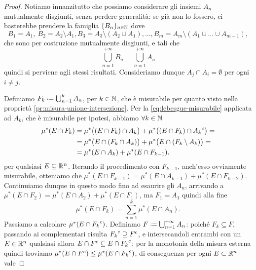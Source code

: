 \begin{proof}
	Notiamo innanzitutto che possiamo considerare gli insiemi $A_n$ mutualmente disgiunti, senza perdere generalità: se già non lo fossero, ci basterebbe prendere la famiglia $\{B_n\}_{n\in\mathbb{N}}$ dove
	\begin{equation}
		B_1=A_1,\ B_2=A_2\setminus A_1, B_3=A_3\setminus(A_2\cup A_1),\dots,B_m=A_m\setminus(A_1\cup\dots\cup A_{m-1}),
	\end{equation}
	che sono per costruzione mutualmente disgiunti, e tali che
	\begin{equation}
		\bigcup_{n=1}^{+\infty}B_n=\bigcup_{n=1}^{+\infty}A_n
	\end{equation}
	quindi si perviene agli stessi risultati.
	Consideriamo dunque $A_j\cap A_i=\emptyset$ per ogni $i\neq j$.

	Definiamo $F_k\defeq\bigcup_{n=1}^kA_n$, per $k\in\mathbb{N}$, che è misurabile per quanto visto nella proprietà \ref{pr:misura-unione-intersezione}.
	Per la \eqref{eq:lebesgue-misurabile} applicata ad $A_k$, che è misurabile per ipotesi, abbiamo $\forall k\in\mathbb{N}$
	\begin{equation}
		\begin{split}
			\mu^*(E\cap F_k)&=\mu^*\big( (E\cap F_k)\cap A_k\big)+\mu^*\big( (E\cap F_k)\cap{A_k}^c\big)=\\
			&=\mu^*\big(E\cap(F_k\cap A_k)\big)+\mu^*\big(E\cap (F_k\setminus A_k)\big)=\\
			&=\mu^*(E\cap A_k)+\mu^*(E\cap F_{k-1}).
		\end{split}
	\end{equation}
	per qualsiasi $E\subseteq\mathbb{R}^n$.
	Iterando il procedimento con $F_{k-1}$, anch'esso ovviamente misurabile, otteniamo che $\mu^*(E\cap F_{k-1})=\mu^*(E\cap A_{k-1})+\mu^*(E\cap F_{k-2})$.
	Continuiamo dunque in questo modo fino ad esaurire gli $A_n$, arrivando a $\mu^*(E\cap F_2)=\mu^*(E\cap A_2)+\mu^*(E\cap F_1)$, ma $F_1=A_1$ quindi alla fine
	\begin{equation}
		\mu^*(E\cap F_k)=\sum_{n=1}^k\mu^*(E\cap A_n).
	\end{equation}
	Passiamo a calcolare $\mu^*(E\cap{F_k}^c)$.
	Definiamo $F\defeq\bigcup_{n=1}^{+\infty}A_n$: poich\'e $F_k\subseteq F$, passando ai complementari risulta ${F_k}^c\supseteq{F}^c$, e intersecandoli entrambi con un $E\in\mathbb{R}^n$ qualsiasi allora $E\cap{F}^c\subseteq E\cap{F_k}^c$; per la monotonia della misura esterna quindi troviamo $\mu^*(E\cap{F}^c)\leq\mu^*(E\cap{F_k}^c)$, di conseguenza per ogni $E\subset\mathbb{R}^n$ vale

\end{proof}
